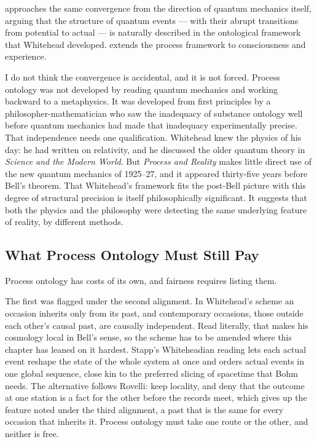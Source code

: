 \citet{Stapp2007} approaches the same convergence from the direction of quantum
mechanics itself, arguing that the structure of quantum events --- with their
abrupt transitions from potential to actual --- is naturally described in the
ontological framework that Whitehead developed.
\citet{Griffin2000} extends the process framework to consciousness and
experience.

I do not think the convergence is accidental, and it is not forced.
Process ontology was not developed by reading quantum mechanics and working
backward to a metaphysics.
It was developed from first principles by a philosopher-mathematician who saw
the inadequacy of substance ontology well before quantum mechanics had made
that inadequacy experimentally precise.
That independence needs one qualification.
Whitehead knew the physics of his day: he had written on relativity, and he
discussed the older quantum theory in \textit{Science and the Modern World}.
But \textit{Process and Reality} makes little direct use of the new quantum
mechanics of 1925--27, and it appeared thirty-five years before Bell's theorem.
That Whitehead's framework fits the post-Bell picture with this degree of
structural precision is itself philosophically significant.
It suggests that both the physics and the philosophy were detecting the same
underlying feature of reality, by different methods.

\subsection*{What Process Ontology Must Still Pay}

Process ontology has costs of its own, and fairness requires listing them.

The first was flagged under the second alignment.
In Whitehead's scheme an occasion inherits only from its past, and contemporary
occasions, those outside each other's causal past, are causally independent.
Read literally, that makes his cosmology local in Bell's sense, so the scheme has
to be amended where this chapter has leaned on it hardest.
Stapp's Whiteheadian reading lets each actual event reshape the state of the
whole system at once and orders actual events in one global sequence, close kin
to the preferred slicing of spacetime that Bohm needs.
The alternative follows Rovelli: keep locality, and deny that the outcome at one
station is a fact for the other before the records meet, which gives up the
feature noted under the third alignment, a past that is the same for every
occasion that inherits it.
Process ontology must take one route or the other, and neither is free.

